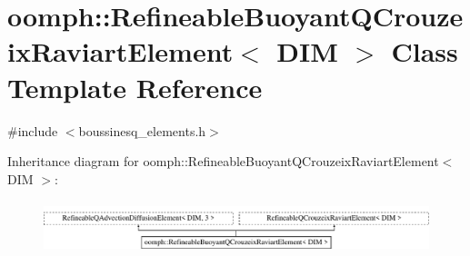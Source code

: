 \hypertarget{classoomph_1_1RefineableBuoyantQCrouzeixRaviartElement}{}\section{oomph\+:\+:Refineable\+Buoyant\+Q\+Crouzeix\+Raviart\+Element$<$ D\+IM $>$ Class Template Reference}
\label{classoomph_1_1RefineableBuoyantQCrouzeixRaviartElement}


{\ttfamily \#include $<$boussinesq\+\_\+elements.\+h$>$}

Inheritance diagram for oomph\+:\+:Refineable\+Buoyant\+Q\+Crouzeix\+Raviart\+Element$<$ D\+IM $>$\+:\begin{figure}[H]
\begin{center}
\leavevmode
\includegraphics[height=1.555556cm]{classoomph_1_1RefineableBuoyantQCrouzeixRaviartElement}
\end{center}
\end{figure}
